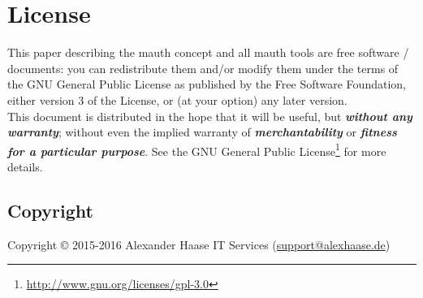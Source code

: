 %
%
%
%
%
%
%

\section{License}

This paper describing the mauth concept and all mauth tools are free software /
documents: you can redistribute them and/or modify them under the terms of the
GNU General Public License as published by the Free Software Foundation, either
version 3 of the License, or (at your option) any later version. \\

This document is distributed in the hope that it will be useful, but \textit{
\textbf{without any warranty}}; without even the implied warranty of \textit{
\textbf{merchantability}} or \textit{\textbf{fitness for a particular purpose}}.
See the GNU General Public License\footnote{\url{
http://www.gnu.org/licenses/gpl-3.0}} for more details.


\subsection{Copyright}

Copyright \copyright{} 2015-2016 Alexander Haase IT Services
	(\href{mailto:support@alexhaase.de}{support@alexhaase.de})
